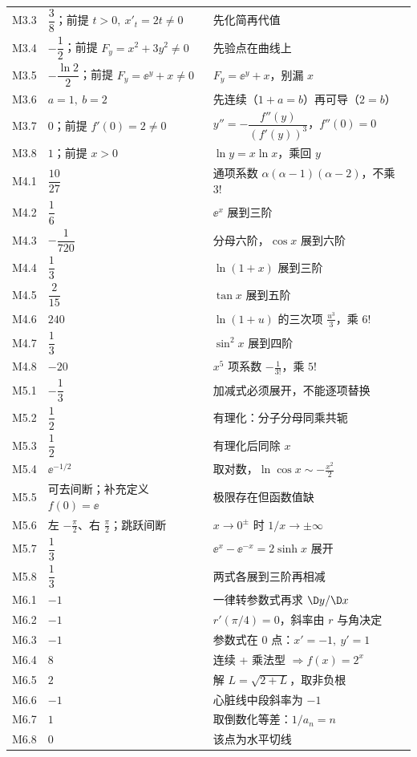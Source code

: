 \documentclass[11pt,a4paper]{ctexart}
\begin{document}
{\begin{longtable}{@{}p{1.4cm}p{7.4cm}p{7.0cm}@{}}
M3.3 & $\dfrac38$；前提 $t>0,\ x'_t=2t\ne0$ & 先化简再代值 \\
M3.4 & $-\dfrac12$；前提 $F_y=x^{2}+3y^{2}\ne0$ & 先验点在曲线上 \\
M3.5 & $-\dfrac{\ln2}{2}$；前提 $F_y=\ee^{y}+x\ne0$ & $F_y=\ee^{y}+x$，别漏 $x$ \\
M3.6 & $a=1,\ b=2$ & 先连续（$1+a=b$）再可导（$2=b$） \\
M3.7 & $0$；前提 $f'(0)=2\ne0$ & $y''=-\dfrac{f''(y)}{(f'(y))^{3}}$，$f''(0)=0$ \\
M3.8 & $1$；前提 $x>0$ & $\ln y=x\ln x$，乘回 $y$ \\
M4.1 & $\dfrac{10}{27}$ & 通项系数 $\alpha(\alpha-1)(\alpha-2)$，不乘 $3!$ \\
M4.2 & $\dfrac16$ & $\ee^{x}$ 展到三阶 \\
M4.3 & $-\dfrac1{720}$ & 分母六阶，$\cos x$ 展到六阶 \\
M4.4 & $\dfrac13$ & $\ln(1+x)$ 展到三阶 \\
M4.5 & $\dfrac{2}{15}$ & $\tan x$ 展到五阶 \\
M4.6 & $240$ & $\ln(1+u)$ 的三次项 $\tfrac{u^3}{3}$，乘 $6!$ \\
M4.7 & $\dfrac13$ & $\sin^{2}x$ 展到四阶 \\
M4.8 & $-20$ & $x^{5}$ 项系数 $-\tfrac1{3!}$，乘 $5!$ \\
M5.1 & $-\dfrac13$ & 加减式必须展开，不能逐项替换 \\
M5.2 & $\dfrac12$ & 有理化：分子分母同乘共轭 \\
M5.3 & $\dfrac12$ & 有理化后同除 $x$ \\
M5.4 & $\ee^{-1/2}$ & 取对数，$\ln\cos x\sim-\tfrac{x^{2}}2$ \\
M5.5 & 可去间断；补充定义 $f(0)=\ee$ & 极限存在但函数值缺 \\
M5.6 & 左 $-\tfrac\pi2$、右 $\tfrac\pi2$；跳跃间断 & $x\to0^{\pm}$ 时 $1/x\to\pm\infty$ \\
M5.7 & $\dfrac13$ & $\ee^{x}-\ee^{-x}=2\sinh x$ 展开 \\
M5.8 & $\dfrac13$ & 两式各展到三阶再相减 \\
M6.1 & $-1$ & 一律转参数式再求 $\D y/\D x$ \\
M6.2 & $-1$ & $r'(\pi/4)=0$，斜率由 $r$ 与角决定 \\
M6.3 & $-1$ & 参数式在 0 点：$x'=-1,\ y'=1$ \\
M6.4 & $8$ & 连续 + 乘法型 $\Rightarrow f(x)=2^{x}$ \\
M6.5 & $2$ & 解 $L=\sqrt{2+L}$，取非负根 \\
M6.6 & $-1$ & 心脏线中段斜率为 $-1$ \\
M6.7 & $1$ & 取倒数化等差：$1/a_n=n$ \\
M6.8 & $0$ & 该点为水平切线 \\
\end{longtable}
}
\end{document}
